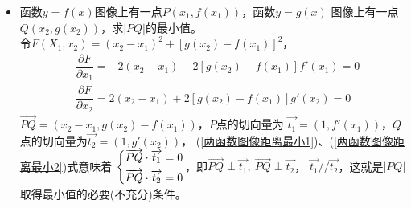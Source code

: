 \begin{itemize}[leftmargin=\inteval{\myitemleftmargin}pt,itemsep=
   \inteval{\myitemitempsep}pt,topsep=\inteval{\myitemtopsep}pt]
\item 函数$ y=f(x) $图像上有一点$ P(x_1,f(x_1)) $，函数$ y=g(x) $
图像上有一点$ Q(x_2,g(x_2)) $，求$ |PQ| $的最小值。\\
令$ F(X_1,x_2)=(x_2-x_1)^2+[g(x_2)-f(x_1)]^2 $，
\begin{align}
    & \dfrac{\partial F}{\partial x_1}=-2(x_2-x_1)-2[g(x_2)-f(x_1)]f'(x_1)=0 
    \label{两函数图像距离最小1}  \\
    & \dfrac{\partial F}{\partial x_2}=2(x_2-x_1)+2[g(x_2)-f(x_1)]g'(x_2)=0
    \label{两函数图像距离最小2}
\end{align}
$ \vec{PQ}=(x_2-x_1,g(x_2)-f(x_1)) $，$ P $点的切向量为
$ \vec{t_1}=(1,f'(x_1)) $，$ Q $点的切向量为$ \vec{t_2}=(1,g'(x_2)) $，
(\ref{两函数图像距离最小1})、(\ref{两函数图像距离最小2})式意味着
$  \begin{dcases}
    \vec{PQ}\cdot \vec{t_1} =0 \\
    \vec{PQ}\cdot \vec{t_2} =0
\end{dcases} $，即$ \vec{PQ}\perp\vec{t_1},\ \vec{PQ}\perp\vec{t_2} $，
$ \vec{t_1}//\vec{t_2} $，这就是$ |PQ| $取得最小值的必要(不充分)条件。


\end{itemize}
